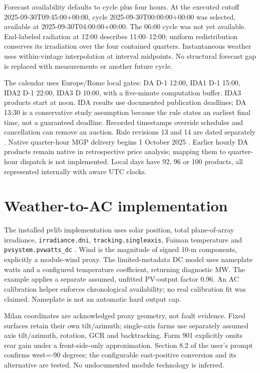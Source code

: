 \documentclass[11pt,a4paper]{article}
\begin{document}
Forecast availability defaults to cycle plus four hours. At the executed cutoff
2025-09-30T09:45:00+00:00,
cycle 2025-09-30T00:00:00+00:00 was selected, available at
2025-09-30T04:00:00+00:00. The 06:00 cycle was not yet
available. End-labeled radiation at 12:00 describes 11:00--12:00; uniform
redistribution conserves its irradiation over the four contained quarters.
Instantaneous weather uses within-vintage interpolation at interval midpoints.
No structural forecast gap is replaced with measurements or another future cycle.

The calendar uses Europe/Rome local gates: DA D-1 12:00, IDA1 D-1 15:00, IDA2
D-1 22:00, IDA3 D 10:00, with a five-minute computation buffer. IDA3 products
start at noon. IDA results use documented publication deadlines; DA 13:30 is a
conservative study assumption because the rule states an earliest final time,
not a guaranteed deadline. Recorded timestamps override schedules and cancellation
can remove an auction. Rule revisions 13 and 14 are dated separately
\cite{gme_dtf03_rev13,gme_dtf03_rev14}. Native quarter-hour MGP delivery begins 1 October 2025
\cite{gme_quarter_hour}. Earlier hourly DA products remain native in retrospective
price analysis; mapping them to quarter-hour dispatch is not implemented. Local days
have 92, 96 or 100 products, all represented internally with aware UTC clocks.

\section{Weather-to-AC implementation}
The installed pvlib implementation uses solar position, total plane-of-array
irradiance, \texttt{irradiance.dni}, \texttt{tracking.singleaxis}, Faiman
temperature and \texttt{pvsystem.pvwatts\_dc} \cite{pvlib_dni,pvlib_tracking,pvlib_pvwatts}.
Wind is the magnitude of signed 10-m components, explicitly a module-wind proxy.
The limited-metadata DC model uses nameplate watts and a configured temperature
coefficient, returning diagnostic MW. The example applies a separate assumed,
unfitted PV-output factor 0.96. An AC calibration helper enforces chronological
availability; no real calibration fit was claimed. Nameplate is not an automatic
hard output cap.

Milan coordinates are acknowledged proxy geometry, not fault evidence. Fixed
surfaces retain their own tilt/azimuth; single-axis farms use separately assumed
axis tilt/azimuth, rotation, GCR and backtracking. Farm 901 explicitly omits rear
gain under a front-side-only approximation. Section 8.2 of the user's prompt
confirms west=-90 degrees; the configurable east-positive conversion and its
alternative are tested. No undocumented module technology is inferred.
\end{document}
